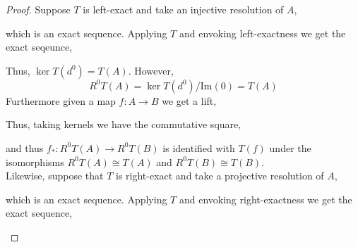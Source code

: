 \documentclass[12pt]{article}
\renewcommand{\Im}[1]{\mathrm{Im}(#1)}
\theoremstyle{remark}
\theoremstyle{definition}
\begin{document}
\begin{proof}
Suppose $T$ is left-exact and take an injective resolution of $A$,
\begin{center}
\end{center}
which is an exact sequence. Applying $T$ and envoking left-exactness we get the exact seqeunce,
\begin{center}
\end{center}
Thus, $\ker{T(d^0)} = T(A)$. However, 
\[ R^0 T(A) = \ker{T(d^0)} / \Im{0} = T(A) \]
Furthermore given a map $f : A \to B$ we get a lift,
\begin{center}
\end{center}
Thus, taking kernels we have the commutative square,
\begin{center}
\end{center}
and thus $f_* : R^0 T(A) \to R^0 T(B)$ is identified with $T(f)$ under the isomorphisms $R^0 T(A) \cong T(A)$ and $R^0 T(B) \cong T(B)$. 
\bigskip\\
Likewise, suppose that $T$ is right-exact and take a projective resolution of $A$,
\begin{center}
\end{center}
which is an exact sequence. Applying $T$ and envoking right-exactness we get the exact sequence,
\begin{center}
\end{center}
\end{proof}
\end{document}
